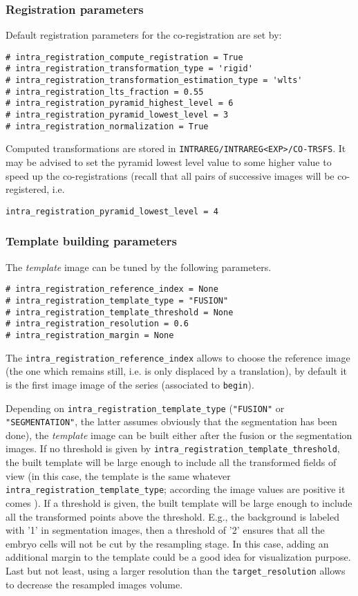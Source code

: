 \subsubsection{Registration parameters}

Default registration parameters for the co-registration are set by:
\begin{verbatim}
# intra_registration_compute_registration = True
# intra_registration_transformation_type = 'rigid'
# intra_registration_transformation_estimation_type = 'wlts'
# intra_registration_lts_fraction = 0.55
# intra_registration_pyramid_highest_level = 6
# intra_registration_pyramid_lowest_level = 3
# intra_registration_normalization = True
\end{verbatim}
Computed transformations are stored in \verb|INTRAREG/INTRAREG<EXP>/CO-TRSFS|.
It may be advised to set the pyramid lowest level value to some higher value to speed up the co-registrations (recall that all pairs of successive images will be co-registered, i.e.
\begin{verbatim}
intra_registration_pyramid_lowest_level = 4
\end{verbatim}


\subsubsection{Template building parameters}

The \textit{template} image can be tuned by the following parameters. 

\begin{verbatim}
# intra_registration_reference_index = None
# intra_registration_template_type = "FUSION"
# intra_registration_template_threshold = None
# intra_registration_resolution = 0.6
# intra_registration_margin = None
\end{verbatim}

The \verb|intra_registration_reference_index| allows to choose the reference image (the one which remains still, i.e. is only displaced by a translation), by default it is the first image image of the series (associated to \verb|begin|).

Depending on \verb|intra_registration_template_type| (\verb|"FUSION"| or \verb|"SEGMENTATION"|, the latter assumes obviously that the segmentation has been done), the \textit{template} image can be built either after the fusion or the segmentation images. If no threshold is given by \verb|intra_registration_template_threshold|, the built template will be large enough to include all the transformed fields of view (in this case, the template is the same whatever \verb|intra_registration_template_type|; according the image values are positive it comes ). If a threshold is given, the built template will be large enough to include all the transformed points above the threshold. E.g., the background is labeled with '1' in segmentation images, then a threshold of '2' ensures that all the embryo cells will not be cut by the resampling stage.  In this case, adding an additional margin to the template could be a good idea for visualization purpose. Last but not least, using a larger resolution than the \verb|target_resolution| allows to decrease the resampled images volume. 

